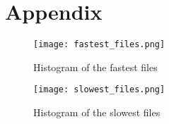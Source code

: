 
\chapter{Appendix}
\begin{figure}[ht]
       \centering 
	    \texttt{[image: fastest\_files.png]}
        \caption{Histogram of the fastest files}
         \label{fig:fastest_files_his}
\end{figure}

\begin{figure}[ht]
       \centering 
	    \texttt{[image: slowest\_files.png]}
        \caption{Histogram of the slowest files}
         \label{fig:slowest_files_his}
\end{figure}

